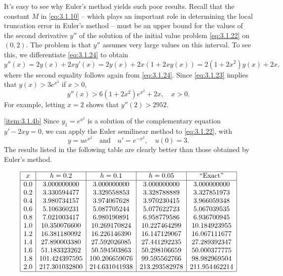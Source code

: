\documentclass{ximera}
\begin{document}
\begin{example}
\begin{explanation}
It's easy to see why Euler's method yields such poor results.
Recall that the constant $M$ in
\eqref{eq:3.1.10} -- which plays an important role in determining the
local truncation error in Euler's method -- must be an upper bound for
the values of the second derivative $y''$ of the solution of the
initial
value problem \eqref{eq:3.1.22} on $(0,2)$. The problem is that $y''$
assumes very large values on this interval. To see this, we
differentiate \eqref{eq:3.1.24} to obtain
$$
y''(x)=2y(x)+2xy'(x)=2y(x)+2x(1+2xy(x))=2(1+2x^2)y(x)+2x,
$$
where the second equality follows again from \eqref{eq:3.1.24}.
Since \eqref{eq:3.1.23} implies that $y(x)>3e^{x^2}$ if $x>0$,
$$
y''(x)>6(1+2x^2)e^{x^2}+2x,\quad x>0.
$$
For example, letting $x=2$ shows that $y''(2)>2952$.

\ref{item:3.1.4b}
Since $y_1=e^{x^2}$ is a solution of the complementary equation
$y'-2xy=0$, we can  apply the Euler semilinear method to
\eqref{eq:3.1.22}, with
$$
y=ue^{x^2}\quad\mbox{and}\quad
u'=e^{-x^2},\quad u(0)=3.
$$
The results listed in the following table are clearly better than
those obtained by Euler's method.

$$
\begin{array}{|c|c|c|c|c|}
\hline
x&
h=0.2&
h=0.1&
h=0.05&
\text{``Exact''}\\ \hline
0.0 &  3.000000000  &   3.000000000 &   3.000000000 &   3.000000000 \\
0.2 &  3.330594477  &   3.329558853 &   3.328788889 &   3.327851973 \\
0.4 &  3.980734157  &   3.974067628 &   3.970230415 &   3.966059348 \\
0.6 &  5.106360231  &   5.087705244 &   5.077622723 &   5.067039535 \\
0.8 &  7.021003417  &   6.980190891 &   6.958779586 &   6.936700945 \\
1.0 & 10.350076600  &  10.269170824 &  10.227464299 &  10.184923955 \\
1.2 & 16.381180092  &  16.226146390 &  16.147129067 &  16.067111677 \\
1.4 & 27.890003380  &  27.592026085 &  27.441292235 &  27.289392347 \\
1.6 & 51.183323262  &  50.594503863 &  50.298106659 &  50.000377775 \\
1.8 &101.424397595  & 100.206659076 &  99.595562766 &  98.982969504 \\
2.0 &217.301032800  & 214.631041938 & 213.293582978 & 211.954462214\\
\hline
\end{array}
$$
\end{explanation}
\end{example}
\end{document}
